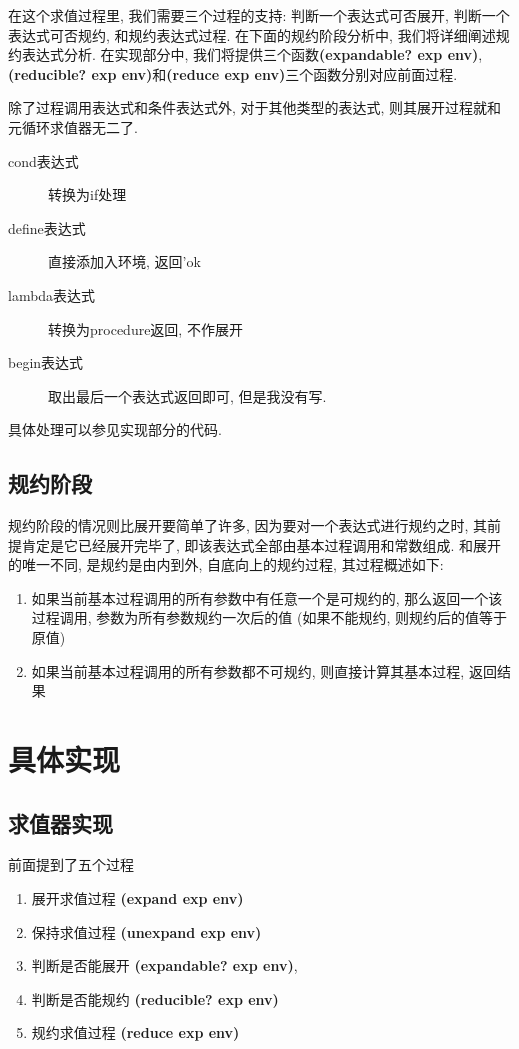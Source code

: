 \documentclass{article}
\begin{document}
\begin{CJK*}{UTF8}{gkai}
在这个求值过程里, 我们需要三个过程的支持: 判断一个表达式可否展开, 判断一个表达式可否规约, 和规约表达式过程. 在下面的规约阶段分析中, 我们将详细阐述规约表达式分析. 在实现部分中, 我们将提供三个函数{\bfseries \ttfamily (expandable? exp env)}, {\bfseries \ttfamily (reducible? exp env)}和{\bfseries \ttfamily (reduce exp env)}三个函数分别对应前面过程.

除了过程调用表达式和条件表达式外, 对于其他类型的表达式, 则其展开过程就和元循环求值器无二了. 

\begin{description}
    \item[cond表达式] 转换为if处理
    \item[define表达式] 直接添加入环境, 返回'ok
    \item[lambda表达式] 转换为procedure返回, 不作展开
    \item[begin表达式] 取出最后一个表达式返回即可, 但是我没有写.
\end{description}

具体处理可以参见实现部分的代码.

\subsection{规约阶段}

规约阶段的情况则比展开要简单了许多, 因为要对一个表达式进行规约之时, 其前提肯定是它已经展开完毕了, 即该表达式全部由基本过程调用和常数组成. 和展开的唯一不同, 是规约是由内到外, 自底向上的规约过程, 其过程概述如下:

\begin{enumerate}
    \item 如果当前基本过程调用的所有参数中有任意一个是可规约的, 那么返回一个该过程调用, 参数为所有参数规约一次后的值 (如果不能规约, 则规约后的值等于原值)
    \item 如果当前基本过程调用的所有参数都不可规约, 则直接计算其基本过程, 返回结果
\end{enumerate}

\section{具体实现}

\subsection{求值器实现}

前面提到了五个过程

\begin{enumerate}
    \item 展开求值过程 {\bfseries \ttfamily (expand exp env)} 
    \item 保持求值过程 {\bfseries \ttfamily (unexpand exp env)}
    \item 判断是否能展开 {\bfseries \ttfamily (expandable? exp env)},
    \item 判断是否能规约 {\bfseries \ttfamily (reducible? exp env)}
    \item 规约求值过程 {\bfseries \ttfamily (reduce exp env)}
\end{enumerate}


\end{CJK*}
\end{document}
